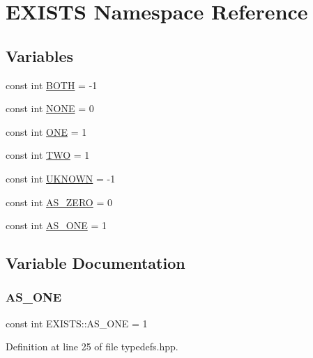 \hypertarget{namespace_e_x_i_s_t_s}{}\section{E\+X\+I\+S\+TS Namespace Reference}
\label{namespace_e_x_i_s_t_s}
\subsection*{Variables}
\begin{DoxyCompactItemize}
\item 
const int \hyperlink{namespace_e_x_i_s_t_s_a256db431572e1e7f26f8dfa6c9cae9bd}{B\+O\+TH} = -\/1
\item 
const int \hyperlink{namespace_e_x_i_s_t_s_a2f75d813424980b47f3e7c9608fb8416}{N\+O\+NE} = 0
\item 
const int \hyperlink{namespace_e_x_i_s_t_s_a4c3717397d716d2bbd69d8239b3de033}{O\+NE} = 1
\item 
const int \hyperlink{namespace_e_x_i_s_t_s_ad76d02e8eb6d20715d333b72394b0648}{T\+WO} = 1
\item 
const int \hyperlink{namespace_e_x_i_s_t_s_a81eb362d951445c658942a433afddb97}{U\+K\+N\+O\+WN} = -\/1
\item 
const int \hyperlink{namespace_e_x_i_s_t_s_a03d550dd049f50f852b8fb4caa48238a}{A\+S\+\_\+\+Z\+E\+RO} = 0
\item 
const int \hyperlink{namespace_e_x_i_s_t_s_a735e5ca6565905e84346e3ff62842a0a}{A\+S\+\_\+\+O\+NE} = 1
\end{DoxyCompactItemize}


\subsection{Variable Documentation}
\mbox{\label{namespace_e_x_i_s_t_s_a735e5ca6565905e84346e3ff62842a0a}} 
\subsubsection{\texorpdfstring{A\+S\+\_\+\+O\+NE}{AS\_ONE}}
{\footnotesize\ttfamily const int E\+X\+I\+S\+T\+S\+::\+A\+S\+\_\+\+O\+NE = 1}



Definition at line 25 of file typedefs.\+hpp.

